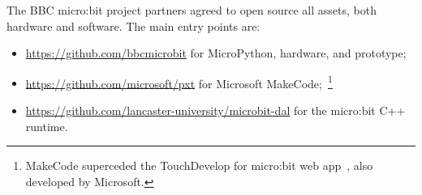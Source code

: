 The BBC micro:bit project partners agreed to open source all assets, both
hardware and software. The main entry points are:
\begin{itemize}
\item \url{https://github.com/bbcmicrobit} for MicroPython, hardware, and prototype;
\item \url{https://github.com/microsoft/pxt} for Microsoft MakeCode;~\footnote{
MakeCode superceded the TouchDevelop for micro:bit web app~\cite{ball2016microsoft}, also developed by Microsoft.    
}
\item \url{https://github.com/lancaster-university/microbit-dal} for the micro:bit
C++ runtime.
\end{itemize}


